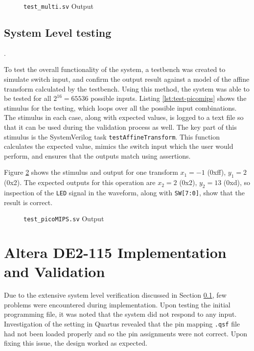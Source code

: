 

\begin{figure}[ht]
	\centering
	
	\caption{\texttt{test\_multi.sv} Output}
	\label{fig:test-multi}
\end{figure}

\subsection{System Level testing} \label{sec:sys-level-testing}.

To test the overall functionality of the system, a testbench was created to simulate switch input, and confirm the output result against a model of the affine transform calculated by the testbench. Using this method, the system was able to be tested for all $2^{16} = 65536$ possible inputs. Listing \ref{lst:test-picomips} shows the stimulus for the testing, which loops over all the possible input combinations. The stimulus in each case, along with expected values, is logged to a text file so that it can be used during the validation process as well. The key part of this stimulus is the SystemVerilog task \texttt{testAffineTransform}. This function calculates the expected value, mimics the switch input which the user would perform, and ensures that the outputs match using assertions.

Figure \ref{fig:test-picomips} shows the stimulus and output for one transform $x_1 = -1$ (0xff), $y_1 = 2$ (0x2). The expected outputs for this operation are $x_2 = 2$ (0x2), $y_2 = 13$ (0xd), so inspection of the \texttt{LED} signal in the waveform, along with \texttt{SW[7:0]}, show that the result is correct.



\begin{figure}[ht]
	\centering
	
	\caption{\texttt{test\_picoMIPS.sv} Output}
	\label{fig:test-picomips}
\end{figure}

\section{Altera DE2-115 Implementation and Validation} \label{sec:implementation}
Due to the extensive system level verification discussed in Section \ref{sec:sys-level-testing}, few problems were encountered during implementation. Upon testing the initial programming file, it was noted that the system did not respond to any input. Investigation of the setting in Quartus revealed that the pin mapping \texttt{.qsf} file had not been loaded properly and so the pin assignments were not correct. Upon fixing this issue, the design worked as expected.

